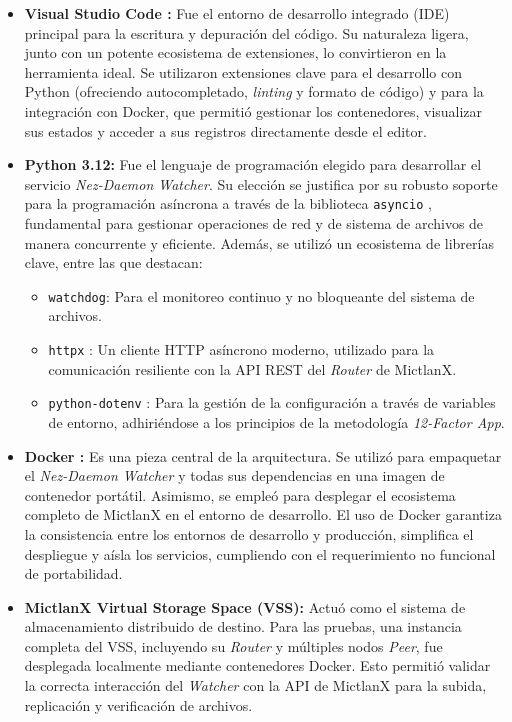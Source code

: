 \begin{itemize}
    \item \textbf{Visual Studio Code \cite{Microsoft:Concepto}:} Fue el entorno de desarrollo integrado (IDE) principal para la escritura y depuración del código. Su naturaleza ligera, junto con un potente ecosistema de extensiones, lo convirtieron en la herramienta ideal. Se utilizaron extensiones clave para el desarrollo con Python (ofreciendo autocompletado, \textit{linting} y formato de código) y para la integración con Docker, que permitió gestionar los contenedores, visualizar sus estados y acceder a sus registros directamente desde el editor.

    \item \textbf{Python 3.12:} Fue el lenguaje de programación elegido para desarrollar el servicio \textit{Nez-Daemon Watcher}. Su elección se justifica por su robusto soporte para la programación asíncrona a través de la biblioteca \texttt{asyncio} \cite{Python:2024:asyncio}, fundamental para gestionar operaciones de red y de sistema de archivos de manera concurrente y eficiente. Además, se utilizó un ecosistema de librerías clave, entre las que destacan:
    \begin{itemize}
        \item \texttt{watchdog}: Para el monitoreo continuo y no bloqueante del sistema de archivos.
                    \item \texttt{httpx} \cite{HTTPX:2024:docs}: Un cliente HTTP asíncrono moderno, utilizado para la comunicación resiliente con la API REST del \textit{Router} de MictlanX.
                    \item \texttt{python-dotenv} \cite{Dotenv:2024:pypi}: Para la gestión de la configuración a través de variables de entorno, adhiriéndose a los principios de la metodología \textit{12-Factor App}.
                \end{itemize}
                
                \item \textbf{Docker \cite{Docker:2024:overview, merkel2014docker}:} Es una pieza central de la arquitectura. Se utilizó para empaquetar el \textit{Nez-Daemon Watcher} y todas sus dependencias en una imagen de contenedor portátil. Asimismo, se empleó para desplegar el ecosistema completo de MictlanX en el entorno de desarrollo. El uso de Docker garantiza la consistencia entre los entornos de desarrollo y producción, simplifica el despliegue y aísla los servicios, cumpliendo con el requerimiento no funcional de portabilidad.

\item \textbf{MictlanX Virtual Storage Space (VSS):} Actuó como el sistema de almacenamiento distribuido de destino. Para las pruebas, una instancia completa del VSS, incluyendo su \textit{Router} y múltiples nodos \textit{Peer}, fue desplegada localmente mediante contenedores Docker. Esto permitió validar la correcta interacción del \textit{Watcher} con la API de MictlanX para la subida, replicación y verificación de archivos.
\end{itemize}

